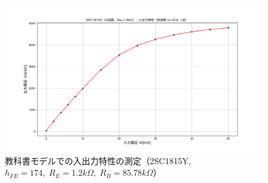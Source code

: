 \documentclass[uplatex,a4paper,11pt,oneside,openany]{jsbook}
\begin{document}
\newpage

\begin{figure}[H]
  \centering
   \includegraphics[keepaspectratio, scale=0.65, angle=90]
               {figs/png/iocharM1Y1_2kR.png}
               \caption{教科書モデルでの入出力特性の測定（2SC1815Y, $h_{FE}=174,\;R_E=1.2k\Omega,\;R_B=85.78k\Omega$）}
               \label{fig:9_2_1}
\end{figure}

\newpage

\end{document}
